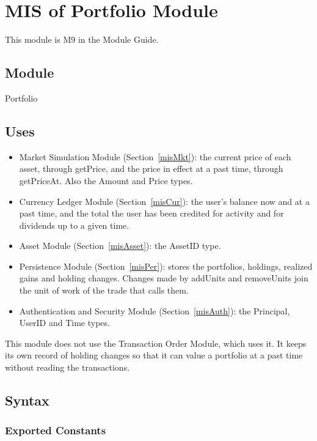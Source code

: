 \documentclass[12pt, titlepage]{article}
\begin{document}
\section{MIS of Portfolio Module} \label{misPort}

This module is M9 in the Module Guide.

\subsection{Module}

Portfolio

\subsection{Uses}

\begin{itemize}
\item Market Simulation Module (Section~\ref{misMkt}): the current price of
  each asset, through getPrice, and the price in effect at a past time,
  through getPriceAt. Also the Amount and Price types.
\item Currency Ledger Module (Section~\ref{misCur}): the user's balance now
  and at a past time, and the total the user has been credited for activity
  and for dividends up to a given time.
\item Asset Module (Section~\ref{misAsset}): the AssetID type.
\item Persistence Module (Section~\ref{misPer}): stores the portfolios,
  holdings, realized gains and holding changes. Changes made by addUnits and
  removeUnits join the unit of work of the trade that calls them.
\item Authentication and Security Module (Section~\ref{misAuth}): the
  Principal, UserID and Time types.
\end{itemize}

\noindent This module does not use the Transaction Order Module, which uses
it. It keeps its own record of holding changes so that it can value a
portfolio at a past time without reading the transactions.

\subsection{Syntax}

\subsubsection{Exported Constants}
\end{document}
